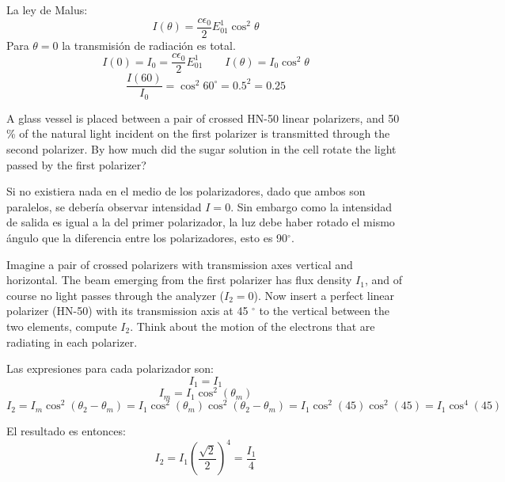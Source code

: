 \documentclass[addpoints,10pt]{exam}
\begin{document}
\begin{questions}
		La ley de Malus:
		\begin{equation}
			I(\theta) = \dfrac{c\epsilon_0}{2}E^1_{01}\cos^2\theta
		\end{equation}
		Para $\theta = 0$ la transmisi\'on de radiaci\'on es total.
		\begin{equation}
			I(0) = I_0 = \dfrac{c\epsilon_0}{2}E^1_{01} \qquad I(\theta) = I_0\cos^2\theta
		\end{equation}
		\begin{equation}
			\dfrac{I(60)}{I_0} = \cos^2 60^\circ = 0.5^2 = 0.25
		\end{equation}
		
		{
			\question
			A glass vessel is placed between a pair of crossed HN-50 linear polarizers, and 50 \% of the natural light incident on the first polarizer is transmitted through the second polarizer. By how much did the sugar solution in the cell rotate the light passed by the first polarizer?
		}
		
		Si no existiera nada en el medio de los polarizadores, dado que ambos son paralelos, se deber\'ia observar intensidad $I = 0$. Sin embargo como la intensidad de salida es igual a la del primer polarizador, la luz debe haber rotado el mismo \'angulo que la diferencia entre los polarizadores, esto es 90$^\circ$.
		
		{
			\question
			Imagine a pair of crossed polarizers with transmission axes vertical and horizontal. The beam emerging from the first polarizer has flux density $I_1$, and of course no light passes through the analyzer ($I_2 = 0$). Now insert a perfect linear polarizer (HN-50) with its transmission axis at 45 $^\circ$ to the vertical between the two elements, compute $I_2$. Think about the motion of the electrons that are radiating in each polarizer.
		}
		
		Las expresiones para cada polarizador son:
		\begin{equation}
			I_1 = I_1
		\end{equation}
		\begin{equation}
			I_m = I_1\cos^2(\theta_m)
		\end{equation}
		\begin{equation}
			I_2 = I_m\cos^2(\theta_2 - \theta_m) =  I_1\cos^2(\theta_m)\cos^2(\theta_2 - \theta_m) = I_1\cos^2(45)\cos^2(45) = I_1\cos^4(45)
		\end{equation}
		
		El resultado es entonces:
		\begin{equation}
			I_2 = I_1\left(\dfrac{\sqrt{2}}{2}\right)^4 = \dfrac{I_1}{4}
		\end{equation}
		

\end{questions}
\end{document}
